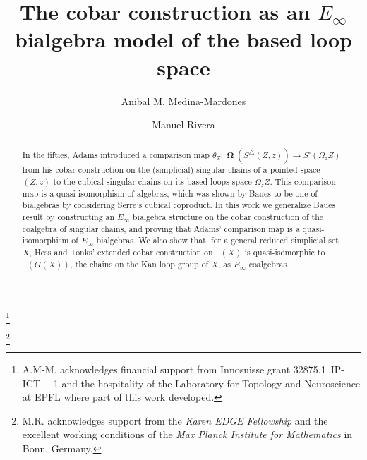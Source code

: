 \documentclass{amsart}
\newcommand{\simplex}{\triangle}
\newcommand{\cube}{\square}
\DeclareMathOperator{\schains}{N^{\simplex}}
\DeclareMathOperator{\cobar}{\mathbf{\Omega}}
\theoremstyle{definition}
\begin{document}
\title{The cobar construction as an $E_\infty$ bialgebra model of the based loop space}
\author{Anibal M. Medina-Mardones}
\address{Max Plank Institute for Mathematics, Bonn, Germany}
\address{Department of Mathematics, University of Notre Dame, Notre Dame, IN, USA}
\thanks{A.M-M. acknowledges financial support from Innosuisse grant \mbox{32875.1 IP-ICT - 1} and the hospitality of the Laboratory for Topology and Neuroscience at EPFL where part of this work developed.}
\author{Manuel Rivera}
\address{Department of Mathematics, Purdue University, West Lafayette, IN, USA}
\thanks{M.R. acknowledges support from the \textit{Karen EDGE Fellowship} and the excellent working conditions of the \textit{Max Planck Institute for Mathematics} in Bonn, Germany.}


\begin{abstract}
    In the fifties, Adams introduced a comparison map $\theta_Z \colon \cobar(S^\simplex(Z,z)) \to S^\cube(\Omega_z Z)$ from his cobar construction on the (simplicial) singular chains of a pointed space $(Z, z)$ to the cubical singular chains on its based loops space $\Omega_z Z$.
	This comparison map is a quasi-isomorphism of algebras, which was shown by Baues to be one of bialgebras by considering Serre's cubical coproduct.
	In this work we generalize Baues result by constructing an $E_\infty$ bialgebra structure on the cobar construction of the coalgebra of singular chains, and proving that Adams' comparison map is a quasi-isomorphism of $E_\infty$ bialgebras.
	We also show that, for a general reduced simplicial set $X$, Hess and Tonks' extended cobar construction on $\schains(X)$ is quasi-isomorphic to $\schains(G(X))$, the chains on the Kan loop group of $X$, as $E_{\infty}$ coalgebras. 
\end{abstract}

\vspace*{-1cm}

\maketitle
\setcounter{tocdepth}{1}
\tableofcontents








\end{document}
